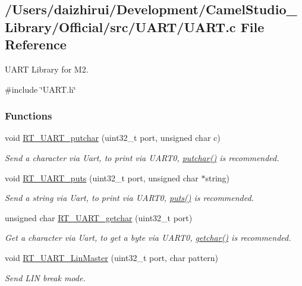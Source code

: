 \hypertarget{a00170}{}\subsection{/\+Users/daizhirui/\+Development/\+Camel\+Studio\+\_\+\+Library/\+Official/src/\+U\+A\+R\+T/\+U\+A\+RT.c File Reference}
\label{a00170}


U\+A\+RT Library for M2.  


{\ttfamily \#include \char`\"{}U\+A\+R\+T.\+h\char`\"{}}\newline
\subsubsection*{Functions}
\begin{DoxyCompactItemize}
\item 
void \mbox{\hyperlink{a00170_ab03e9e1a8d4d9b97583db27174086108}{R\+T\+\_\+\+U\+A\+R\+T\+\_\+putchar}} (uint32\+\_\+t port, unsigned char c)
\begin{DoxyCompactList}\small\item\em Send a character via Uart, to print via U\+A\+R\+T0, \mbox{\hyperlink{a00095_a948b7a0779c308ac5502c57e282e6933}{putchar()}} is recommended. \end{DoxyCompactList}\item 
void \mbox{\hyperlink{a00170_ad61c03a00ccd43875563c16f97d61af7}{R\+T\+\_\+\+U\+A\+R\+T\+\_\+puts}} (uint32\+\_\+t port, unsigned char $\ast$string)
\begin{DoxyCompactList}\small\item\em Send a string via Uart, to print via U\+A\+R\+T0, \mbox{\hyperlink{a00095_a46036bd75b920766eef64eb7910c887d}{puts()}} is recommended. \end{DoxyCompactList}\item 
unsigned char \mbox{\hyperlink{a00170_abc136df9d66fe27bf8ffcc319246591e}{R\+T\+\_\+\+U\+A\+R\+T\+\_\+getchar}} (uint32\+\_\+t port)
\begin{DoxyCompactList}\small\item\em Get a character via Uart, to get a byte via U\+A\+R\+T0, \mbox{\hyperlink{a00095_a0979671914792955a7a68461634ff82d}{getchar()}} is recommended. \end{DoxyCompactList}\item 
void \mbox{\hyperlink{a00170_ab0faf051e642e540b1b9c114eae242bd}{R\+T\+\_\+\+U\+A\+R\+T\+\_\+\+Lin\+Master}} (uint32\+\_\+t port, char pattern)
\begin{DoxyCompactList}\small\item\em Send L\+IN break mode. \end{DoxyCompactList}\end{DoxyCompactItemize}


